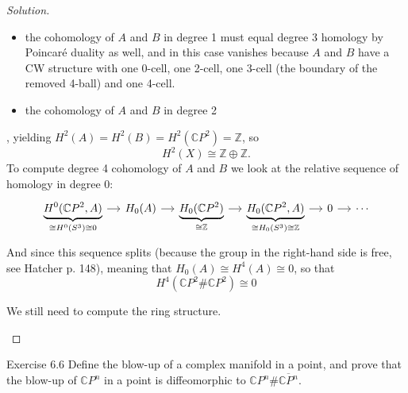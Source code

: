 \begin{proof}[Solution]
\begin{enumerate}[label=\alph*.]
\begin{itemize}
\item the cohomology of $A$ and $B$ in degree 1 must equal degree 3 homology by Poincaré duality as well, and in this case vanishes because $A$ and  $B$ have a CW structure with one 0-cell, one 2-cell, one 3-cell (the boundary of the removed 4-ball) and one 4-cell.

\item the cohomology of $A$ and $B$ in degree 2
\end{itemize}

				, yielding $H^{2}(A)=H^{2}(B)=H^{2}(\mathbb{C}P^{2})=\mathbb{Z}$, so
				\[H^{2}(X)\cong \mathbb{Z}\oplus \mathbb{Z}.\]\fi
			To compute degree 4 cohomology of $A$ and  $B$ we look at the relative sequence of homology in degree 0:			\[\begin{tikzcd}[column sep=small]
				\underbrace{H^0(\mathbb{C}P^{2},A)}_{\cong H^0(S^3)\cong 0}\arrow[r]&H_0(A)\arrow[r]&\underbrace{H_0(\mathbb{C}P^{2})}_{\cong\mathbb{Z}}\arrow[r]&\underbrace{H_0(\mathbb{C}P^{2},A)}_{\cong H_0(S^3)\cong\mathbb{Z}}\arrow[r]&0\arrow[r]&\cdots
			\end{tikzcd}\]
			And since this sequence splits (because the group in the right-hand side is free, see Hatcher p. 148), meaning that $H_0(A)\cong H^{4}(A)\cong 0$, so that
			\[H^{4}(\mathbb{C}P^{2}\#\mathbb{C}P^{2})\cong 0\]

			We still need to compute the ring structure.

			\end{enumerate}
\end{proof}

\begin{thing7}{Exercise 6.6}\leavevmode
	Define the blow-up of a complex manifold in a point, and prove that the blow-up of $\mathbb{C}P^{n}$ in a point is diffeomorphic to $\mathbb{C}P^{n}\#\overline{\mathbb{C}P^{n}}$.
\end{thing7}

